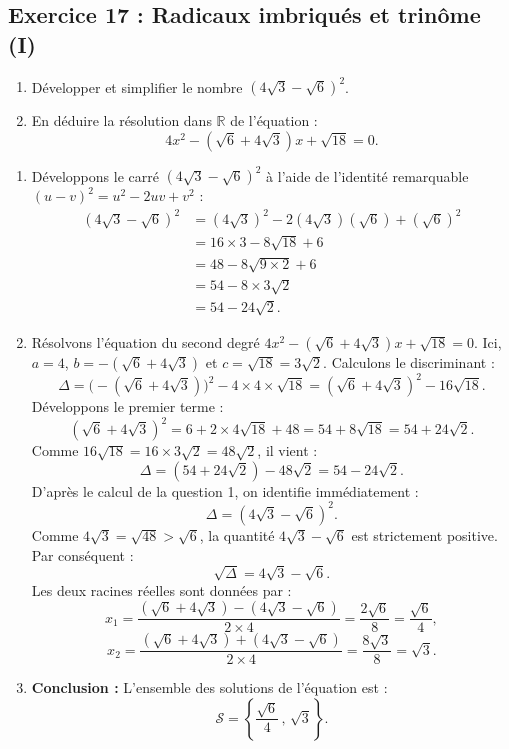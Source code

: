 \documentclass[11pt,a4paper]{article}
\newcommand{\R}{\mathbb{R}}
\begin{document}
\subsection*{Exercice 17 : Radicaux imbriqués et trinôme (I)}
\begin{enumerate}
    \item Développer et simplifier le nombre $(4\sqrt{3} - \sqrt{6})^2$.
    \item En déduire la résolution dans $\R$ de l'équation :
    \[
    4x^2 - (\sqrt{6} + 4\sqrt{3})x + \sqrt{18} = 0.
    \]
\end{enumerate}

\begin{correctionbox}
\begin{enumerate}
    \item Développons le carré $(4\sqrt{3} - \sqrt{6})^2$ à l'aide de l'identité remarquable $(u-v)^2 = u^2 - 2uv + v^2$ :
    \begin{align*}
    (4\sqrt{3} - \sqrt{6})^2 &= (4\sqrt{3})^2 - 2(4\sqrt{3})(\sqrt{6}) + (\sqrt{6})^2 \\
    &= 16 \times 3 - 8\sqrt{18} + 6 \\
    &= 48 - 8\sqrt{9 \times 2} + 6 \\
    &= 54 - 8 \times 3\sqrt{2} \\
    &= 54 - 24\sqrt{2}.
    \end{align*}

    \item Résolvons l'équation du second degré $4x^2 - (\sqrt{6} + 4\sqrt{3})x + \sqrt{18} = 0$.
    Ici, $a = 4$, $b = -(\sqrt{6} + 4\sqrt{3})$ et $c = \sqrt{18} = 3\sqrt{2}$.
    Calculons le discriminant :
    \[
    \Delta = \bigl(-(\sqrt{6} + 4\sqrt{3})\bigr)^2 - 4 \times 4 \times \sqrt{18} = (\sqrt{6} + 4\sqrt{3})^2 - 16\sqrt{18}.
    \]
    Développons le premier terme :
    \[
    (\sqrt{6} + 4\sqrt{3})^2 = 6 + 2 \times 4\sqrt{18} + 48 = 54 + 8\sqrt{18} = 54 + 24\sqrt{2}.
    \]
    Comme $16\sqrt{18} = 16 \times 3\sqrt{2} = 48\sqrt{2}$, il vient :
    \[
    \Delta = (54 + 24\sqrt{2}) - 48\sqrt{2} = 54 - 24\sqrt{2}.
    \]
    D'après le calcul de la question 1, on identifie immédiatement :
    \[
    \Delta = (4\sqrt{3} - \sqrt{6})^2.
    \]
    Comme $4\sqrt{3} = \sqrt{48} > \sqrt{6}$, la quantité $4\sqrt{3} - \sqrt{6}$ est strictement positive. Par conséquent :
    \[
    \sqrt{\Delta} = 4\sqrt{3} - \sqrt{6}.
    \]
    Les deux racines réelles sont données par :
    \[
    x_1 = \frac{(\sqrt{6} + 4\sqrt{3}) - (4\sqrt{3} - \sqrt{6})}{2 \times 4} = \frac{2\sqrt{6}}{8} = \frac{\sqrt{6}}{4},
    \]
    \[
    x_2 = \frac{(\sqrt{6} + 4\sqrt{3}) + (4\sqrt{3} - \sqrt{6})}{2 \times 4} = \frac{8\sqrt{3}}{8} = \sqrt{3}.
    \]

    \item \textbf{Conclusion :}
    L'ensemble des solutions de l'équation est :
    \[
    \mathcal{S} = \left\{ \frac{\sqrt{6}}{4}\,,\, \sqrt{3} \right\}.
    \]
\end{enumerate}
\end{correctionbox}
\end{document}
